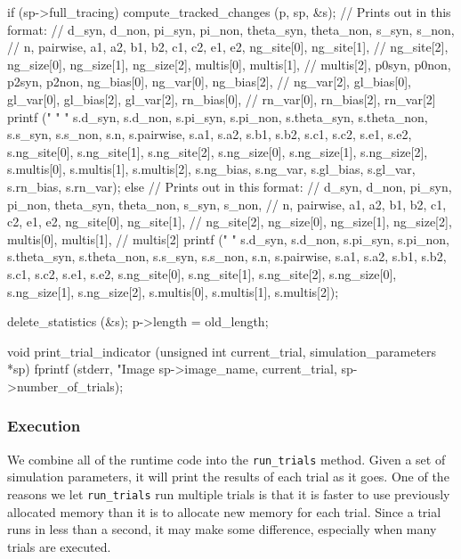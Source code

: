 \documentclass{article}
\begin{document}
\begin{ccode}
{  if (sp->full_tracing) {
    compute_tracked_changes 	(p, sp, &s);
    // Prints out in this format:
    // d_syn, d_non, pi_syn, pi_non, theta_syn, theta_non, s_syn, s_non,
    // n, pairwise, a1, a2, b1, b2, c1, c2, e1, e2, ng_site[0], ng_site[1],
    // ng_site[2], ng_size[0], ng_size[1], ng_size[2], multis[0], multis[1],
    // multis[2], p0syn, p0non, p2syn, p2non, ng_bias[0], ng_var[0], ng_bias[2],
    // ng_var[2], gl_bias[0], gl_var[0], gl_bias[2], gl_var[2], rn_bias[0],
    // rn_var[0], rn_bias[2], rn_var[2]
    printf ("%
	    "%
	    "%
	    s.d_syn, s.d_non, s.pi_syn, s.pi_non, s.theta_syn, s.theta_non,
	    s.s_syn, s.s_non, s.n, s.pairwise, s.a1, s.a2, s.b1, s.b2, s.c1,
	    s.c2, s.e1, s.e2, s.ng_site[0], s.ng_site[1], s.ng_site[2],
	    s.ng_size[0], s.ng_size[1], s.ng_size[2], s.multis[0], s.multis[1],
	    s.multis[2], s.ng_bias, s.ng_var, s.gl_bias, s.gl_var, s.rn_bias,
	    s.rn_var);
  } else {
    // Prints out in this format:
    // d_syn, d_non, pi_syn, pi_non, theta_syn, theta_non, s_syn, s_non,
    // n, pairwise, a1, a2, b1, b2, c1, c2, e1, e2, ng_site[0], ng_site[1],
    // ng_site[2], ng_size[0], ng_size[1], ng_size[2], multis[0], multis[1],
    // multis[2]
    printf ("%
	    "%
	    s.d_syn, s.d_non, s.pi_syn, s.pi_non, s.theta_syn, s.theta_non,
	    s.s_syn, s.s_non, s.n, s.pairwise, s.a1, s.a2, s.b1, s.b2, s.c1,
	    s.c2, s.e1, s.e2, s.ng_site[0], s.ng_site[1], s.ng_site[2],
	    s.ng_size[0], s.ng_size[1], s.ng_size[2], s.multis[0], s.multis[1],
	    s.multis[2]);
  }

  delete_statistics (&s);
  p->length = old_length;
}

void print_trial_indicator (unsigned int current_trial, simulation_parameters *sp) {
  fprintf (stderr, "Image %
         sp->image_name, current_trial, sp->number_of_trials);
}
\end{ccode}

      \subsubsection{Execution}

	We combine all of the runtime code into the \verb|run_trials| method.
	Given a set of simulation parameters, it will print the results of each
	trial as it goes. One of the reasons we let \verb|run_trials| run
	multiple trials is that it is faster to use previously allocated memory
	than it is to allocate new memory for each trial. Since a trial runs in
	less than a second, it may make some difference, especially when many
	trials are executed.
\end{document}
